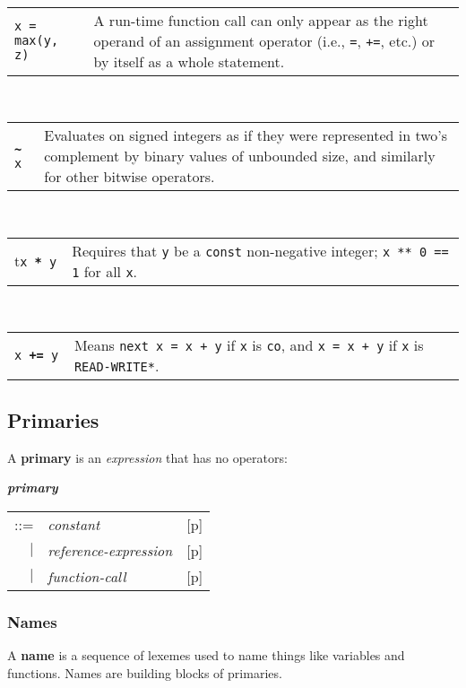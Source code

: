 \documentclass[12pt]{article}
\newcommand{\TT}[1]{{\tt \bfseries #1}}
\newcommand{\key}[1]{{\rm \bfseries #1}}
\newcommand{\emkey}[1]{{\em \bfseries #1}}
\newcommand{\pagref}[1]{p\pageref{#1}}
\newenvironment{indpar}[1][0.3in]%
	{\begin{list}{}%
		     {\setlength{\itemsep}{0in}%
		      \setlength{\topsep}{0in}%
		      \setlength{\parsep}{1ex}%
		      \setlength{\labelwidth}{#1}%
		      \setlength{\leftmargin}{#1}%
		      \addtolength{\leftmargin}{\labelsep}}%
	 \item}%
	{\end{list}}
\begin{document}
\\[0.5ex]
\begin{tabular}{p{1.5in}p{4.5in}}
\tt x = max(y, z)
    & A run-time function call can only appear as the right operand of
      an assignment operator (i.e., {\tt =}, {\tt +=}, etc.) or by itself
      as a whole statement.
\end{tabular}
\\[0.5ex]
\begin{tabular}{p{1.5in}p{4.5in}}
\tt \TT{\textasciitilde} x
             & Evaluates on signed integers as if they were represented
               in two's complement by binary values of unbounded size,
	       and similarly for other bitwise operators.
\end{tabular}
\\[0.5ex]
\begin{tabular}{p{1.5in}p{4.5in}}
t\tt x \TT{**} y
             & Requires that {\tt y} be a {\tt const} non-negative integer;
	       {\tt x ** 0 == 1} for all {\tt x}.
\end{tabular}
\\[0.5ex]
\begin{tabular}{p{1.5in}p{4.5in}}
\tt x \TT{+=} y & Means {\tt next x = x + y} if {\tt x}
is {\tt co}, and {\tt x = x + y} if {\tt x} is {\tt *READ-WRITE*}.
\end{tabular}

\subsection{Primaries}

A \key{primary} is an {\em expression} that has no operators:
\begin{indpar}
\emkey{primary}
    \begin{tabular}[t]{@{}rll}
    ::= & {\em constant}		& [\pagref{CONSTANTS}] \\
    $|$ & {\em reference-expression}    & [\pagref{REFERENCE-EXPRESSIONS}] \\
    $|$ & {\em function-call}		& [\pagref{FUNCTION-CALLS}] \\
    \end{tabular}
\end{indpar}

\subsubsection{Names}
\label{NAMES}

A \key{name} is a sequence of lexemes used to name things like
variables and functions.  Names are building blocks of primaries.
\end{document}
